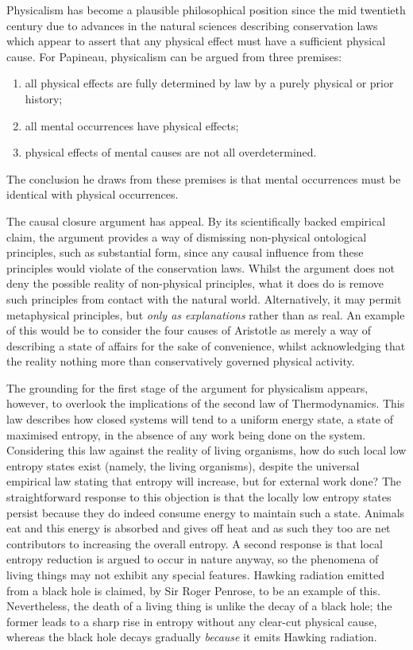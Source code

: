 Physicalism has become a plausible philosophical position since the mid twentieth century due to advances in the natural sciences describing conservation laws which appear to assert that any physical effect must have a sufficient physical cause. For Papineau, physicalism can be argued from three premises:
\begin{enumerate}
\item all physical effects are fully determined by law by a purely physical or prior history;
\item all mental occurrences have physical effects;
\item physical effects of mental causes are not all overdetermined.
\end{enumerate}
The conclusion he draws from these premises is that mental occurrences must be identical with physical occurrences. \parencite[][6]{Papineau2001-PAPTRO}

The causal closure argument has appeal. By its scientifically backed empirical claim, the argument provides a way of dismissing non-physical ontological principles, such as substantial form, since any causal influence from these principles would violate of the conservation laws. Whilst the argument does not deny the possible reality of non-physical principles, what it does do is remove such principles from contact with the natural world. Alternatively, it may permit metaphysical principles, but \emph{only as explanations} rather than as real. An example of this would be to consider the four causes of Aristotle as merely a way of describing a state of affairs for the sake of convenience, whilst acknowledging that the reality nothing more than conservatively governed physical activity.

The grounding for the first stage of the argument for physicalism appears, however, to overlook the implications of the second law of Thermodynamics. This law describes how closed systems will tend to a uniform energy state, a state of maximised entropy, in the absence of any work being done on the system. Considering this law against the reality of living organisms, how do such local low entropy states exist (namely, the living organisms), despite the universal empirical law stating that entropy will increase, but for external work done? The straightforward response to this objection is that the locally low entropy states persist because they do indeed consume energy to maintain such a state. Animals eat and this energy is absorbed and gives off heat and as such they too are net contributors to increasing the overall entropy. A second response is that local entropy reduction is argued to occur in nature anyway, so the phenomena of living things may not exhibit any special features. Hawking radiation emitted from a black hole is claimed, by Sir Roger Penrose, to be an example of this. Nevertheless, the death of a living thing is unlike the decay of a black hole; the former leads to a sharp rise in entropy without any clear-cut physical cause, whereas the black hole decays gradually \emph{because} it emits Hawking radiation.


